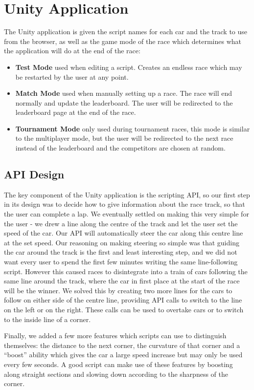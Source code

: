 \section{Unity Application}
The Unity application is given the script names for each car and the track to use from the browser, as well as the game mode of the race which determines what the application will do at the end of the race:
\begin{itemize}
  \item \textbf{Test Mode} used when editing a script. Creates an endless race which may be restarted by the user at any point.
  \item \textbf{Match Mode} used when manually setting up a race. The race will end normally and update the leaderboard. The user will be redirected to the leaderboard page at the end of the race.
  \item \textbf{Tournament Mode} only used during tournament races, this mode is similar to the multiplayer mode, but the user will be redirected to the next race instead of the leaderboard and the competitors are chosen at random.
\end{itemize}

\subsection{API Design}
The key component of the Unity application is the scripting API, so our first step in its design was to decide how to give information about the race track, so that the user can complete a lap. We eventually settled on making this very simple for the user - we drew a line along the centre of the track and let the user set the speed of the car. Our API will automatically steer the car along this centre line at the set speed. Our reasoning on making steering so simple was that guiding the car around the track is the first and least interesting step, and we did not want every user to spend the first few minutes writing the same line-following script. However this caused races to disintegrate into a train of cars following the same line around the track, where the car in first place at the start of the race will be the winner. We solved this by creating two more lines for the cars to follow on either side of the centre line, providing API calls to switch to the line on the left or on the right. These calls can be used to overtake cars or to switch to the inside line of a corner.

Finally, we added a few more features which scripts can use to distinguish themselves: the distance to the next corner, the curvature of that corner and a ``boost'' ability which gives the car a large speed increase but may only be used every few seconds. A good script can make use of these features by boosting along straight sections and slowing down according to the sharpness of the corner.

